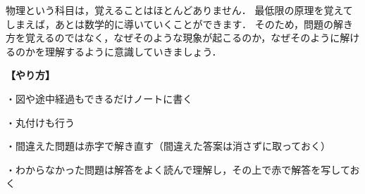 \documentclass[a4j,10pt]{jsarticle}
\begin{document}
物理という科目は，覚えることはほとんどありません．
最低限の原理を覚えてしまえば，あとは数学的に導いていくことができます．
そのため，問題の解き方を覚えるのではなく，なぜそのような現象が起こるのか，なぜそのように解けるのかを理解するように意識していきましょう．




\vspace{5mm}

%
%
%
%

{\bf【やり方】}


・図や途中経過もできるだけノートに書く

・丸付けも行う

・間違えた問題は赤字で解き直す（間違えた答案は消さずに取っておく）

・わからなかった問題は解答をよく読んで理解し，その上で赤で解答を写しておく
\newpage
\tableofcontents
\newpage

  \ 
  
\newpage


 \ 
 
\newpage

 \ 
 
\newpage





 \ 
 
\newpage

 \ 
 
\newpage

 \ 
 
\newpage

 \ 
 
\newpage




 \ 
 
\newpage




 \ 
 
\newpage


 \ 
 
\newpage


 \ 
 
\end{document}
